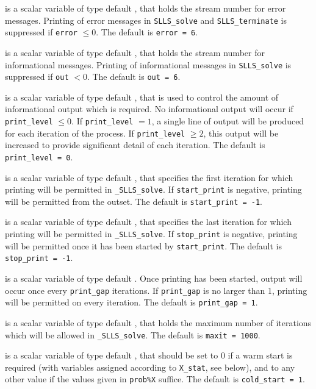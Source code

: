 \documentclass{galahad}
\newcommand{\packagename}{SLLS}
\newcommand{\fullpackagename}{\libraryname\_\packagename}
\newcommand{\solver}{{\tt \fullpackagename\_solve}}
\begin{document}
\begin{description}

 is a scalar variable of type default \integer, that holds the
stream number for error messages. Printing of error messages in
{\tt \packagename\_solve} and {\tt \packagename\_terminate}
is suppressed if {\tt error} $\leq 0$.
The default is {\tt error = 6}.

 is a scalar variable of type default \integer, that holds the
stream number for informational messages. Printing of informational messages in
{\tt \packagename\_solve} is suppressed if {\tt out} $< 0$.
The default is {\tt out = 6}.

 is a scalar variable of type default \integer, that is used
to control the amount of informational output which is required. No
informational output will occur if {\tt print\_level} $\leq 0$. If
{\tt print\_level} $= 1$, a single line of output will be produced for each
iteration of the process. If {\tt print\_level} $\geq 2$, this output will be
increased to provide significant detail of each iteration.
The default is {\tt print\_level = 0}.

 is a scalar variable of type default \integer, that specifies
the first iteration for which printing will be permitted in \solver.
If {\tt start\_print} is negative, printing will be permitted from the outset.
The default is {\tt start\_print = -1}.

 is a scalar variable of type default \integer, that specifies
the last iteration for which printing will be permitted in  \solver.
If {\tt stop\_print} is negative, printing will be permitted once it has been
started by {\tt start\_print}.
The default is {\tt stop\_print = -1}.

 is a scalar variable of type default \integer.
Once printing has been started, output will occur once every
{\tt print\_gap} iterations. If {\tt print\_gap} is no larger than 1,
printing will be permitted on every iteration.
The default is {\tt print\_gap = 1}.

 is a scalar variable of type default \integer, that holds the
maximum number of iterations which will be allowed in \solver.
The default is {\tt maxit = 1000}.

 is a scalar variable of type default \integer, that
should be set to 0 if a warm start is required (with variables
assigned according to {\tt X\_stat}, see below), and to any other value if the
values given in {\tt prob\%X} suffice.
The default is {\tt cold\_start = 1}.


\end{description}
\end{document}
